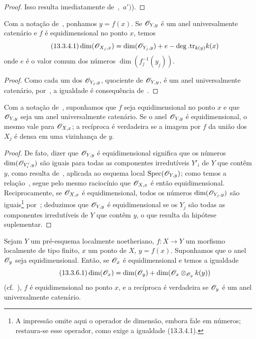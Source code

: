 \begin{proof}
Isso resulta imediatamente de~,~$a')$).
\end{proof}

\begin{corollary}[13.3.4]
\label{IV.13.3.4}
Com a notação de~, ponhamos $y=f(x)$.
Se $\mathscr{O}_{Y,y}$ é um anel universalmente catenário e $f$ é
equidimensional no ponto $x$, temos
\[
\tag{13.3.4.1}
\label{IV.13.3.4.1}
  \dim(\sh{O}_{X_j,x})=\dim(\sh{O}_{Y_j,y})+e-\deg.\mathrm{tr}_{k(y)}k(x)
\]
onde $e$ é o valor comum dos números $\dim(f_j^{-1}(y_j))$.
\end{corollary}

\begin{proof}
Como cada um dos $\mathscr{O}_{Y_j,y}$, quociente de $\mathscr{O}_{Y,y}$, é um anel
universalmente catenário, por~, a igualdade é consequência
de~.
\end{proof}

\begin{corollary}[13.3.5]
\label{IV.13.3.5}
Com a notação de~, suponhamos que $f$ seja equidimensional
no ponto $x$ e que $\mathscr{O}_{Y,y}$ seja um anel universalmente catenário.
Se o anel $\mathscr{O}_{Y,y}$ é equidimensional, o mesmo vale para
$\mathscr{O}_{X,x}$; a recíproca é verdadeira se a imagem por $f$ da união dos
$X_j$ é densa em uma vizinhança de $y$.
\end{corollary}

\begin{proof}
De fato, dizer que $\mathscr{O}_{Y,y}$ é equidimensional significa que os números
$\dim(\mathscr{O}_{Y'_i,y})$ são iguais para todas as componentes irredutíveis
$Y'_i$ de $Y$ que contêm $y$, como resulta de~,
aplicada ao esquema local $\operatorname{Spec}(\mathscr{O}_{Y,y})$; como temos a
relação~, segue pelo mesmo raciocínio que
$\mathscr{O}_{X,x}$ é então equidimensional.
Reciprocamente, se $\mathscr{O}_{X,x}$ é equidimensional, todos os números
$\dim(\mathscr{O}_{Y_j,y})$ são iguais\footnote{A impressão omite aqui o operador
de dimensão, embora fale em números; restaura-se esse operador, como exige
a igualdade (13.3.4.1).} por~; deduzimos que $\mathscr{O}_{Y,y}$
é equidimensional se os $Y_j$ são todas as componentes irredutíveis de $Y$
que contêm $y$, o que resulta da hipótese suplementar.
\end{proof}

\begin{proposition}[13.3.6]
\label{IV.13.3.6}
Sejam $Y$ um pré-esquema localmente noetheriano,
$f:X\to Y$ um morfismo localmente de tipo finito, $x$ um ponto de $X$,
$y=f(x)$.
Suponhamos que o anel $\mathscr{O}_y$ seja equidimensional.
Então, se $\mathscr{O}_x$ é equidimensional e temos a igualdade
\[
\tag{13.3.6.1}
\label{IV.13.3.6.1}
  \dim(\sh{O}_x)=\dim(\sh{O}_y)+\dim(\sh{O}_x\otimes_{\sh{O}_y}k(y))
\]
(cf.~), $f$ é equidimensional no ponto $x$, e a recíproca
é verdadeira se $\mathscr{O}_y$ é um anel universalmente catenário.
\end{proposition}

